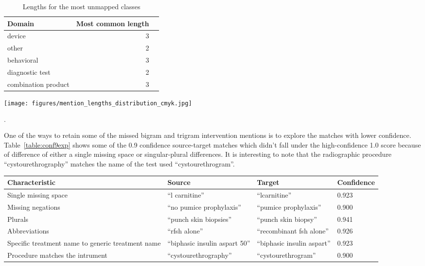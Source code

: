 \documentclass[letterpaper]{article} %
\begin{document}
%
\begin{table}[!htbp]
\centering
\begin{tabular}{lrl}
\hline \textbf{Domain} & \textbf{ Most common length } \\ \hline
device & 3 \\
other & 2 \\
behavioral & 3 \\
diagnostic test & 2 \\
combination product & 3 \\
\hline
\end{tabular}
\caption{Lengths for the most unmapped classes}
\label{table:len_unmapped_classes} 
\end{table}
%
%
%
\begin{figure*}[hbt!]
\centering
\texttt{[image: figures/mention\_lengths\_distribution\_cmyk.jpg]}
\caption{Left) Phrase length distribution of mapped intervention mentions, Right) Phrase length distribution of unmapped intervention mentions}.
\label{app:length_mappedunmapped}
\end{figure*}
%
%
%


One of the ways to retain some of the missed bigram and trigram intervention mentions is to explore the matches with lower confidence.
Table~\ref{table:conf9exp} shows some of the 0.9 confidence source-target matches which didn't fall under the high-confidence 1.0 score because of difference of either a single missing space or singular-plural differences.
It is interesting to note that the radiographic procedure ``cystourethrography'' matches the name of the test used ``cystourethrogram''.
%
\begin{table*}
\begin{center}
    \begin{tabular}{p{5cm}p{4cm}p{4cm}p{2cm}}
    \hline \textbf{Characteristic} & \textbf{Source} & \textbf{Target} & \textbf{Confidence} \\ \hline
    Single missing space & ``l carnitine'' & ``lcarnitine'' & 0.923\\
    Missing negations & ``no pumice prophylaxis''&  ``pumice prophylaxis''  & 0.900\\
    Plurals & ``punch skin biopsies'' &  ``punch skin biopsy''  & 0.941\\
    Abbreviations & ``rfsh alone'' & ``recombinant fsh alone'' & 0.926\\
    Specific treatment name to generic treatment name & ``biphasic insulin aspart 50'' & ``biphasic insulin aspart'' & 0.923\\
    Procedure matches the intrument & ``cystourethrography'' & ``cystourethrogram'' & 0.900\\
    \hline
    \end{tabular}
\end{center}
\caption{Example ``Intervention'' mentions from CTO that get mapped to target sentences $t$ with a $d_{s}$ of 0.9}
\label{table:conf9exp} 
\end{table*} 
%
%
%
\end{document}
